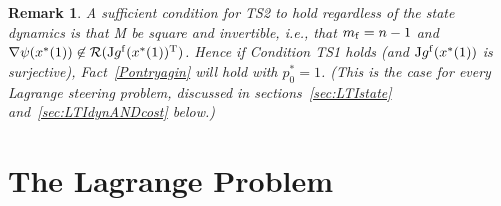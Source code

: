 \documentclass[letterpaper,10pt,conference]{ieeeconf}
\newtheorem{remark}{Remark} %
\begin{document}
\begin{remark}
\label{rem:TS2}
A sufficient condition for TS2 to hold regardless of the
state dynamics is that
{\rm M} be square and invertible, i.e., that $m_{\rm f}=n-1$ and
$\nabla\psi(x^*(1))\not\in{\mathcal R}({\rm J}g^{\rm f}(x^*(1))^{\rm T})$.
Hence if Condition TS1 holds (and ${\rm J}g^{\rm f}(x^*(1))$ is surjective), 
Fact~\ref{Pontryagin} will hold with $p_0^*=1$.
(This is the case for every Lagrange {\em steering} problem, discussed in
sections~\ref{sec:LTIstate} and~\ref{sec:LTIdynANDcost} below.)
\end{remark}

\section{The Lagrange Problem}
\label{sec:Lagrange Problem}
\end{document}
